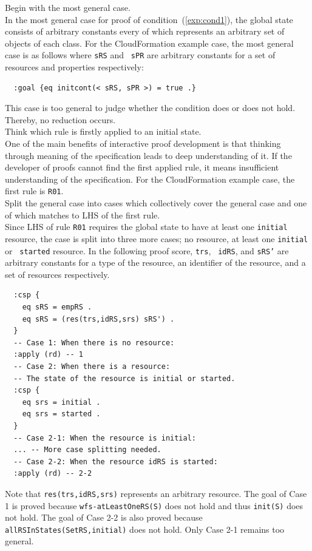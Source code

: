 \documentclass[12pt]{report}
\newcommand{\stt}[1]{{\small{\tt {#1}}}}
\begin{document}
 Begin with the most general case. \\ In the
most general case for proof of condition~(\ref{exp:cond1}), the global
state consists of arbitrary constants every of which represents an
arbitrary set of objects of each class. For the CloudFormation example
case, the most general case is as follows where {\tt sRS} and {\tt
  sPR} are arbitrary constants for a set of resources and properties
respectively:
\small
\begin{verbatim}
  :goal {eq initcont(< sRS, sPR >) = true .}
\end{verbatim}
\normalsize
This case is too general to judge whether the condition does or does
not hold. Thereby, no reduction occurs.\\

 Think which rule is firstly applied to an
initial state. \\ One of the main benefits of interactive proof
development is that thinking through meaning of the specification
leads to deep understanding of it. If the developer of proofs cannot
find the first applied rule, it means insufficient understanding of
the specification. For the CloudFormation example case, the first rule
is {\tt R01}. \\

 Split the general case into cases which
collectively cover the general case and one of which matches to LHS of
the first rule. \\ Since LHS of rule {\tt R01} requires the global
state to have at least one {\tt initial} resource, the case is split
into three more cases; no resource, at least one {\tt initial} or {\tt
  started} resource. In the following proof score, {\tt trs}, {\tt
  idRS}, and {\tt sRS'} are arbitrary constants for a type of the
resource, an identifier of the resource, and a set of resources
respectively. 
\small
\begin{verbatim}
  :csp { 
    eq sRS = empRS .
    eq sRS = (res(trs,idRS,srs) sRS') .
  }
  -- Case 1: When there is no resource:
  :apply (rd) -- 1
  -- Case 2: When there is a resource:
  -- The state of the resource is initial or started.
  :csp { 
    eq srs = initial .
    eq srs = started .
  }
  -- Case 2-1: When the resource is initial:
  ... -- More case splitting needed.
  -- Case 2-2: When the resource idRS is started:
  :apply (rd) -- 2-2
\end{verbatim}
\normalsize
Note that \stt{res(trs,idRS,srs)} represents an arbitrary resource.
The goal of Case 1 is proved because \stt{wfs-atLeastOneRS(S)} does
not hold and thus \stt{init(S)} does not hold. The goal of Case 2-2 is
also proved because \stt{allRSInStates(SetRS,initial)} does not hold.
Only Case 2-1 remains too general.\\
\end{document}
